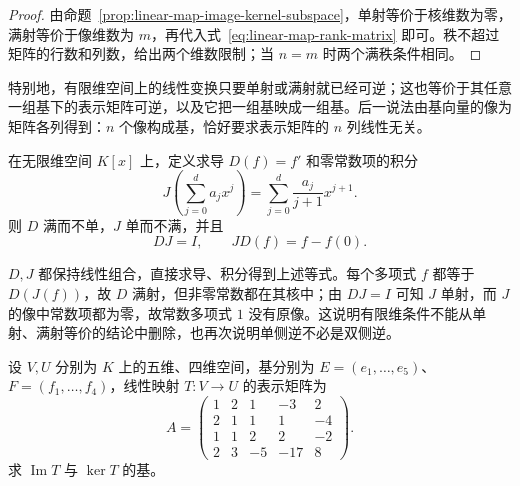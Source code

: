 \begin{proof}
由命题~\ref{prop:linear-map-image-kernel-subspace}，单射等价于核维数为零，满射等价于像维数为 $m$，再代入式~\eqref{eq:linear-map-rank-matrix} 即可。秩不超过矩阵的行数和列数，给出两个维数限制；当 $n=m$ 时两个满秩条件相同。
\end{proof}

特别地，有限维空间上的线性变换只要单射或满射就已经可逆；这也等价于其任意一组基下的表示矩阵可逆，以及它把一组基映成一组基。后一说法由基向量的像为矩阵各列得到：$n$ 个像构成基，恰好要求表示矩阵的 $n$ 列线性无关。

\begin{example}
\label{ex:linear-map-infinite-dimension}
在无限维空间 $K[x]$ 上，定义求导 $D(f)=f'$ 和零常数项的积分
\[
    J\left(\sum_{j=0}^d a_jx^j\right)
    =\sum_{j=0}^d\frac{a_j}{j+1}x^{j+1}.
\]
则 $D$ 满而不单，$J$ 单而不满，并且
\[
    DJ=I,\qquad JD(f)=f-f(0).
\]
\end{example}

\begin{solve}
$D,J$ 都保持线性组合，直接求导、积分得到上述等式。每个多项式 $f$ 都等于 $D(J(f))$，故 $D$ 满射，但非零常数都在其核中；由 $DJ=I$ 可知 $J$ 单射，而 $J$ 的像中常数项都为零，故常数多项式 $1$ 没有原像。这说明有限维条件不能从单射、满射等价的结论中删除，也再次说明单侧逆不必是双侧逆。
\end{solve}

\begin{example}
\label{ex:linear-map-image-kernel-matrix}
设 $V,U$ 分别为 $K$ 上的五维、四维空间，基分别为 $E=(e_1,\ldots,e_5)$、$F=(f_1,\ldots,f_4)$，线性映射 $T:V\to U$ 的表示矩阵为
\[
    A=\begin{pmatrix}
        1&2&1&-3&2\\
        2&1&1&1&-4\\
        1&1&2&2&-2\\
        2&3&-5&-17&8
    \end{pmatrix}.
\]
求 $\operatorname{Im}T$ 与 $\ker T$ 的基。
\end{example}

